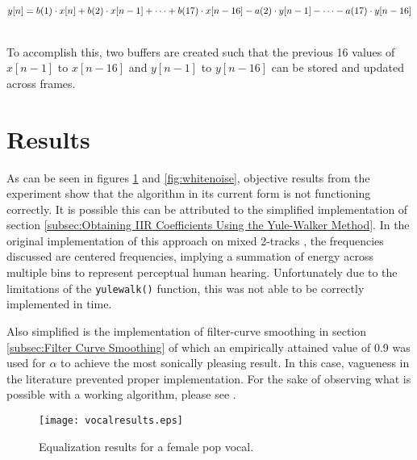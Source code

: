 \documentclass{article}
\begin{document}
\begin{multiline}
$y[n] = b(1) \cdot x[n] + b(2) \cdot x[n-1] + \cdots + b(17) \cdot x[n-16] - \\
a(2) \cdot y[n-1] - \cdots - a(17) \cdot y[n-16]$\\
\end{multiline}

\\To accomplish this, two buffers are created such that the previous 16 values of $x[n-1]$ to $x[n-16]$ and $y[n-1]$ to $y[n-16]$ can be stored and updated across frames.

\section{Results}
\label{sec:Results}

As can be seen in figures \ref{fig:vocal} and \ref{fig:whitenoise}, objective results from the experiment show that the algorithm in its current form is not functioning correctly.  It is possible this can be attributed to the simplified implementation of section \ref{subsec:Obtaining IIR Coefficients Using the Yule-Walker Method}.  In the original implementation of this approach on mixed 2-tracks \cite{ma2013implementation}, the frequencies discussed are centered frequencies, implying a summation of energy across multiple bins to represent perceptual human hearing.  Unfortunately due to the limitations of the \texttt{yulewalk()} function, this was not able to be correctly implemented in time.

Also simplified is the implementation of filter-curve smoothing in section \ref{subsec:Filter Curve Smoothing} of which an empirically attained value of 0.9 was used for $\alpha$ to achieve the most sonically pleasing result.  In this case, vagueness in the literature prevented proper implementation.  For the sake of observing what is possible with a working algorithm, please see \cite{ma2013implementation}.

\begin{figure}[htbp]
\centering
\texttt{[image: vocalresults.eps]}
\caption{Equalization results for a female pop vocal.}
\label{fig:vocal}
\end{figure}
\end{document}
